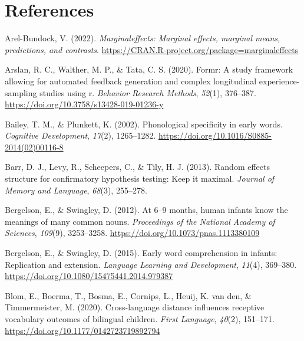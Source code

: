 \documentclass[
]{article}
\newlength{\cslhangindent}
\newlength{\cslentryspacingunit} %
\newenvironment{CSLReferences}[2] %
 {%
  \setlength{\parindent}{0pt}
  \ifodd #1
  \let\oldpar\par
  \def\par{\hangindent=\cslhangindent\oldpar}
  \fi
  \setlength{\parskip}{#2\cslentryspacingunit}
 }%
 {}
\begin{document}
\hypertarget{references}{%
\section*{References}\label{references}}

\hypertarget{refs}{}
\begin{CSLReferences}{1}{0}
\leavevmode{}%
Arel-Bundock, V. (2022). \emph{Marginaleffects: Marginal effects,
marginal means, predictions, and contrasts}.
\url{https://CRAN.R-project.org/package=marginaleffects}

\leavevmode{}%
Arslan, R. C., Walther, M. P., \& Tata, C. S. (2020). Formr: A study
framework allowing for automated feedback generation and complex
longitudinal experience-sampling studies using r. \emph{Behavior
Research Methods}, \emph{52}(1), 376--387.
\url{https://doi.org/10.3758/s13428-019-01236-y}

\leavevmode{}%
Bailey, T. M., \& Plunkett, K. (2002). Phonological specificity in early
words. \emph{Cognitive Development}, \emph{17}(2), 1265--1282.
\url{https://doi.org/10.1016/S0885-2014(02)00116-8}

\leavevmode{}%
Barr, D. J., Levy, R., Scheepers, C., \& Tily, H. J. (2013). Random
effects structure for confirmatory hypothesis testing: Keep it maximal.
\emph{Journal of Memory and Language}, \emph{68}(3), 255--278.

\leavevmode{}%
Bergelson, E., \& Swingley, D. (2012). At 6--9 months, human infants
know the meanings of many common nouns. \emph{Proceedings of the
National Academy of Sciences}, \emph{109}(9), 3253--3258.
\url{https://doi.org/10.1073/pnas.1113380109}

\leavevmode{}%
Bergelson, E., \& Swingley, D. (2015). Early word comprehension in
infants: Replication and extension. \emph{Language Learning and
Development}, \emph{11}(4), 369--380.
\url{https://doi.org/10.1080/15475441.2014.979387}

\leavevmode{}%
Blom, E., Boerma, T., Bosma, E., Cornips, L., Heuij, K. van den, \&
Timmermeister, M. (2020). Cross-language distance influences receptive
vocabulary outcomes of bilingual children. \emph{First Language},
\emph{40}(2), 151--171. \url{https://doi.org/10.1177/0142723719892794}


\end{CSLReferences}
\end{document}
